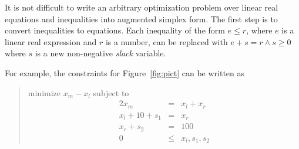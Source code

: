 \documentclass{article}
\begin{document}
It is not difficult to write an arbitrary optimization problem over linear
real equations and inequalities into augmented simplex form.  The first
step is to convert inequalities to equations.  Each inequality of the form
$e \leq r$, where $e$ is a linear real expression and $r$ is a number, can be
replaced with $e + s = r \wedge s \geq 0$ where $s$ is a new non-negative
\emph{slack} variable.

For example, the constraints for Figure~\ref{fig:pict} can be written as
\begin{quote}\vspace*{-1ex}
minimize $x_m - x_l$ 
subject to 
$$\begin{array}{rcl}
2 x_m & = & x_l + x_r \\
x_l + 10 + s_1& = &x_r \\
x_r + s_2 &= &100 \\
0 &\leq & x_l, s_1, s_2
\end{array}$$
\end{quote}\vspace{-0.9ex}
\end{document}

